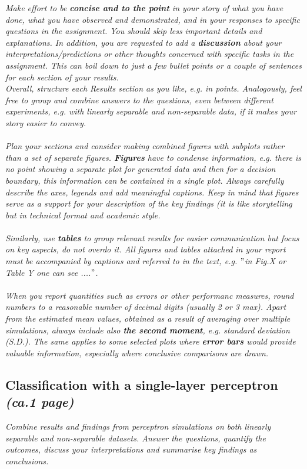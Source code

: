 \documentclass[a4paper]{article}
\begin{document}
\begin{framed}
\textit{Make effort to be \textbf{concise and to the point} in your story of what you have done, what you have observed and demonstrated, and in your responses to specific questions in the assignment. You should skip less important details and explanations. In addition, you are requested to add a \textbf{discussion} about your interpretations/predictions or other thoughts concerned with specific tasks in the assignment. This can boil down to just a few bullet points or a couple of sentences for each section of your results. \\ Overall, structure each Results section as you like, e.g. in points. Analogously, feel free to group and combine answers to the questions, even between different experiments, e.g. with linearly separable and non-separable data, if it makes your story easier to convey. \\
\\Plan your sections and consider making combined figures with subplots rather than a set of separate figures. \textbf{Figures} have to condense information, e.g. there is no point showing a separate plot for generated data and then for a decision boundary, this information can be contained in a single plot. Always carefully describe the axes, legends and add meaningful captions. Keep in mind that figures serve as a support for your description of the key findings (it is like storytelling but in technical format and academic style. \\
\\Similarly, use \textbf{tables} to group relevant results for easier communication but focus on key aspects, do not overdo it. All figures and tables attached in your report must be accompanied by captions and referred to in the text, e.g. $"$in Fig.X or Table Y one can see ....$"$. \\
\\When you report quantities such as errors or other performanc measures, round numbers to a reasonable number of decimal digits (usually 2 or 3 max). Apart from the estimated mean values, obtained as a result of averaging over multiple simulations, always include also \textbf{the second moment}, e.g. standard deviation (S.D.). The same applies to some selected plots where \textbf{error bars} would provide valuable information, especially where conclusive comparisons are drawn.} 
\end{framed}

\subsection{Classification with a single-layer perceptron \textit{(ca.1 page)}}
\textit{Combine results and findings from perceptron simulations on both linearly separable and non-separable datasets. Answer the questions, quantify the outcomes, discuss your interpretations and summarise key findings as conclusions.}
\end{document}
